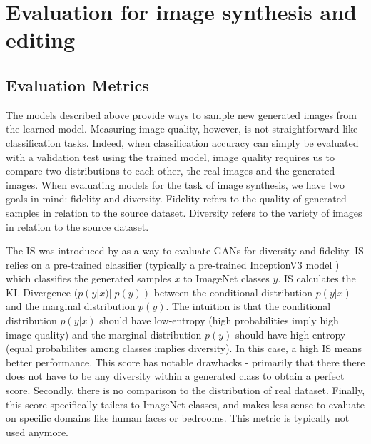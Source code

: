 



\section{Evaluation for image synthesis and editing}

\subsection{Evaluation Metrics}

The models described above provide ways to sample new generated images from the learned model. 
Measuring image quality, however, is not straightforward like classification tasks. Indeed, when 
classification accuracy can simply be evaluated with a validation test using the trained model, 
image quality requires us to compare two distributions to each other, the real images and the 
generated images. When evaluating models for the task of image synthesis, we have two goals in mind:
fidelity and diversity. Fidelity refers to the quality of generated samples in relation to the 
source dataset. Diversity refers to the variety of images in relation to the source 
dataset.


The \ac{IS} was introduced by \cite{improved_techniques_gans} as a way to evaluate 
\ac{GAN}s for diversity and fidelity. \ac{IS} relies on a pre-trained classifier 
(typically a pre-trained InceptionV3 model \citep{szegedy2016rethinking}) which classifies the 
generated samples $x$ to ImageNet classes $y$. \ac{IS} calculates the \ac{KL}-Divergence $(p(y|x) || p(y))$ between the 
conditional distribution $p(y|x)$  and the marginal distribution $p(y)$.
The intuition 
is that the conditional distribution $p(y|x)$ should have low-entropy (high probabilities 
imply high image-quality)
and the marginal distribution $p(y)$ should have high-entropy (equal probabilites 
among classes implies diversity). In this case, 
a high \ac{IS} means better performance. This score has notable drawbacks - 
primarily that there there does not have to be any diversity within a generated class 
to obtain a perfect score. Secondly, there is no comparison to the distribution of 
real dataset. Finally, this score specifically tailers to ImageNet classes, and 
makes less sense to evaluate on specific domains like human faces or bedrooms. This metric
 is typically not used anymore.

